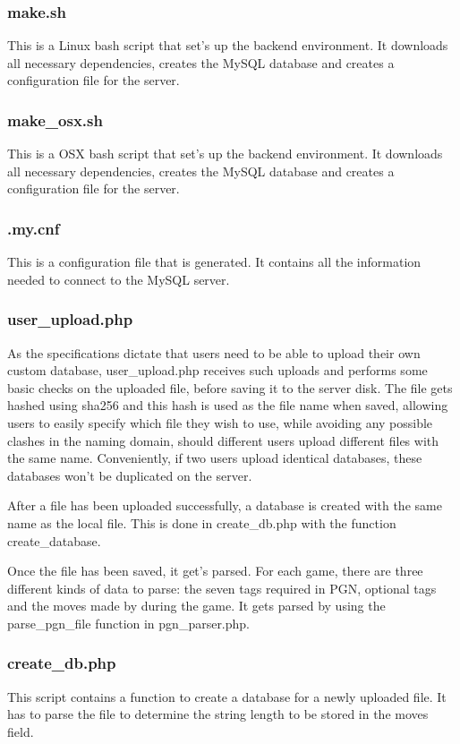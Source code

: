 \documentclass{article}
\begin{document}
\subsubsection{make.sh}
This is a Linux bash script that set's up the backend environment. It downloads all necessary dependencies, creates the MySQL database and creates a configuration file for the server.


\subsubsection{make\_osx.sh}
This is a OSX bash script that set's up the backend environment. It downloads all necessary dependencies, creates the MySQL database and creates a configuration file for the server.


\subsubsection{.my.cnf}
This is a configuration file that is generated. It contains all the information needed to connect to the MySQL server.


\subsubsection{user\_upload.php}
As the specifications dictate that users need to be able to upload their own custom database, user\_upload.php receives such uploads and performs some basic checks on the uploaded file, before saving it to the server disk.  The file gets hashed using sha256 and this hash is used as the file name when saved, allowing users to easily specify which file they wish to use, while avoiding any possible clashes in the naming domain, should different users upload different files with the same name.  Conveniently, if two users upload identical databases, these databases won't be duplicated on the server.

After a file has been uploaded successfully, a database is created with the same name as the local file.  This is done in create\_db.php with the function create\_database.

Once the file has been saved, it get's parsed. For each game, there are three different kinds of data to parse:  the seven tags required in PGN, optional tags and the moves made by during the game.  It gets parsed by using the parse\_pgn\_file function in pgn\_parser.php.


\subsubsection{create\_db.php}
This script contains a function to create a database for a newly uploaded file. It has to parse the file to determine the string length to be stored in the moves field.
\end{document}
